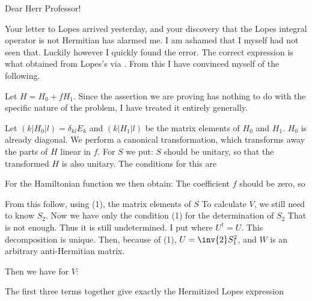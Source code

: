 \date{August 26, 1944}


Dear Herr Professor!

Your letter to Lopes arrived yesterday, and your discovery that the Lopes integral operator is not Hermitian has alarmed me. I am ashamed that I myself had not seen that. Luckily however I quickly found the error. The correct expression is what obtained from Lopes's via . From this I have convinced myself of the following.

Let $H = H_0 + fH_1$. Since the assertion we are proving has nothing to do with the specific nature of the problem, I have treated it entirely generally.

Let $(k|H_0|l)=\delta_{kl}E_k$ and $(k|H_1|l)$ be the matrix elements of $H_0$ and $H_1$. $H_0$ is already diagonal. We perform a canonical transformation, which transforms away the parts of $H$ linear in $f$.
For $S$ we put:
$S$ should be unitary, so that the transformed $H$ is also unitary. The conditions for this are


For the Hamiltonian function we then obtain:
The coefficient $f$ should be zero, so

From this follow, using (1), the matrix elements of $S$
To calculate $V$, we still need to know $S_2$. Now we have only the condition (1) for the determination of $S_2$
 That is not enough. Thus it is still undetermined. I put
where $U^\dagger = U$. This decomposition is unique. Then, because of (1), $U = \inv{2}S_1^2$, and $W$ is an arbitrary anti-Hermitian matrix.

Then we have for $V$:

The first three terms together give exactly the Hermitized Lopes expression

